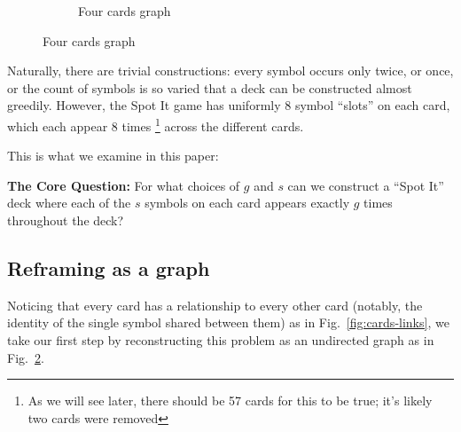 \documentclass[11pt, oneside]{article} 	%
\begin{document}
\begin{figure}[!htb]
\begin{subfigure}{.2\textwidth}
\centering
{}
\caption{Four cards graph}
\label{fig:cards-graph}
\end{subfigure}

\end{figure}

Naturally, there are trivial constructions: every symbol occurs only twice, or once, or the count of symbols is so varied that a deck can be constructed almost greedily. However, the Spot It game has uniformly 8 symbol ``slots'' on each card, which each appear 8 times \footnote{As we will see later, there should be 57 cards for this to be true; it's likely two cards were removed} across the different cards. 

This is what we examine in this paper:

\begin{framed}
\textbf{The Core Question:} For what choices of $g$ and $s$ can we construct a ``Spot It'' deck where each of the $s$ symbols on each card appears exactly $g$ times throughout the deck?
\end{framed}

\subsection{Reframing as a graph}
Noticing that every card has a relationship to every other card (notably, the identity of the single symbol shared between them) as in Fig.~\ref{fig:cards-links}, we take our first step by reconstructing this problem as an undirected graph as in Fig.~\ref{fig:cards-graph}. 
\end{document}
